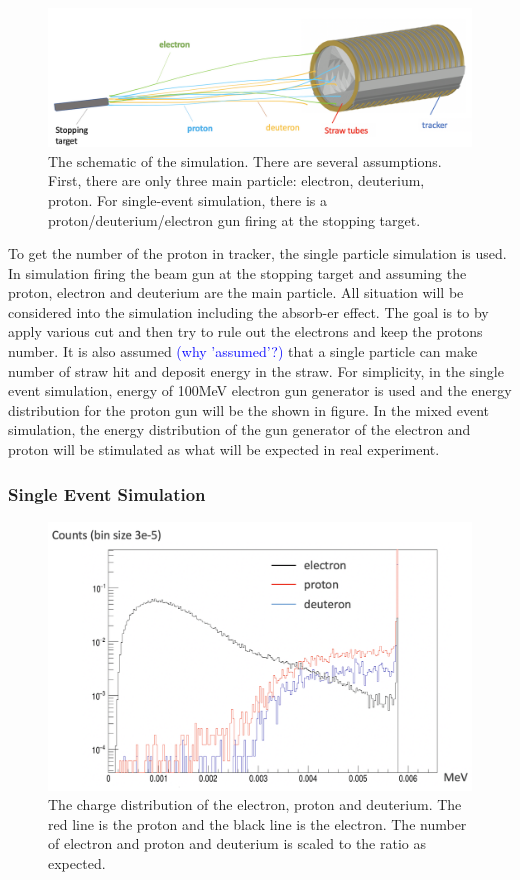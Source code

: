\documentclass[12pt]{extarticle}
\begin{document}
\begin{figure}[H]
\centering
\includegraphics[width=1\linewidth]{figure/simulation.png}
\caption{The schematic of the simulation. There are several assumptions. First, there are only three main particle: electron, deuterium, proton. For single-event simulation, there is a proton/deuterium/electron gun firing at the stopping target.}
\label{}
\end{figure}
\noindent To get the number of the proton in tracker, the single particle simulation is used. In simulation firing the beam gun at the stopping target and assuming the proton, electron and deuterium are the main particle. All situation will be considered into the simulation including the absorb-er effect. 
The goal is to by apply various cut and then try to rule out the electrons and keep the protons number. It is also assumed \textcolor{blue}{(why 'assumed'?)} that a single particle can make number of straw hit and deposit energy in the straw. For simplicity, in the single event simulation, energy of 100MeV electron gun generator is used and the energy distribution for the proton gun will be the shown in figure.
In the mixed event simulation, the energy distribution of the gun generator of the electron and proton will be stimulated as what will be expected in real experiment\cite{Mu2e_Art}. 

\subsubsection{Single Event Simulation }
\begin{figure}[H]
\centering
\includegraphics[width=1\linewidth]{figure/qsh_single.png}
\caption{The charge distribution of the electron, proton and deuterium. The red line is the proton and the black line is the electron. The number of electron and proton and deuterium is scaled to the ratio as expected.}
\label{charge}
\end{figure}
\end{document}
